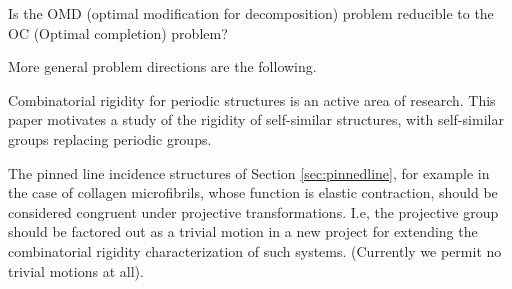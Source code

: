 \begin{openproblem}
    Is the OMD (optimal modification for decomposition) problem
    reducible to the OC (Optimal completion) problem?
\end{openproblem}

More general problem directions are the following.
\begin{openproblem}
    Combinatorial rigidity for
    periodic structures is an active area of research. This paper motivates
    a study of the rigidity of self-similar structures,
    with self-similar groups replacing periodic groups.
\end{openproblem}

\begin{openproblem}
    The pinned line incidence structures of Section \ref{sec:pinnedline},
    for example in the case of collagen microfibrils, whose function is
    elastic contraction, should be considered
    congruent under projective transformations. I.e, the projective group
    should be factored out as a trivial motion in a new project for
    extending the combinatorial rigidity characterization of such systems.
    (Currently we permit no trivial motions at all).
\end{openproblem}






